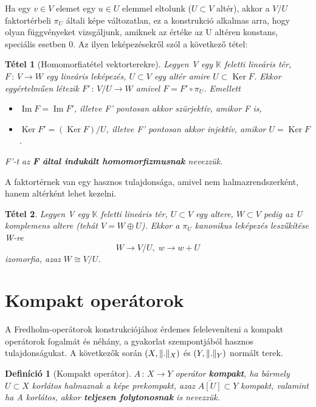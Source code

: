 \documentclass[oneside, titlepage, 12pt, a4paper]{report}
\newtheorem{theorem}{Tétel}[section]
\newtheorem{definition}{Definíció}[section]
\DeclareMathOperator{\Ima}{Im}	%
\DeclareMathOperator{\Ker}{Ker}	%
\DeclarePairedDelimiter\norm{\lVert}{\rVert}	%
\begin{document}
Ha egy $v \in V$ elemet egy $u \in U$ elemmel eltolunk ($U \subset V$ altér), akkor a $V / U$ faktortérbeli $\pi_U$ általi képe változatlan, ez a konstrukció alkalmas arra, hogy olyan függvényeket vizsgáljunk, amiknek az értéke az U altéren konstans, speciális esetben 0. Az ilyen leképezésekről szól a következő tétel:	%
\begin{theorem}[Homomorfiatétel vektorterekre]
Legyen V egy $\mathbb{K}$ feletti lineáris tér, $F \, : \, V \rightarrow W$ egy lineáris leképezés, $U \subset V$ egy altér amire $U \subset \Ker F$. Ekkor egyértelműen létezik $F' \, : \, V / U \rightarrow W$ amivel $F = F' \circ \pi_U$. Emellett
\begin{itemize}
\item
$\Ima F = \Ima F'$, illetve F' pontosan akkor szürjektív, amikor F is,
\item
$\Ker F' = (\Ker F) / U$, illetve F' pontosan akkor injektív, amikor $U = \Ker F$.
\end{itemize}
F'-t az \textbf{F által indukált homomorfizmusnak} nevezzük.	%
\end{theorem}

A faktortérnek van egy hasznos tulajdonsága, amivel nem halmazrendszerként, hanem altérként lehet kezelni.
\begin{theorem}
Legyen V egy $\mathbb{K}$ feletti lineáris tér, $U \subset V$ egy altere, $W \subset V$ pedig az U komplemens altere (tehát $V = W \oplus U$). Ekkor a $\pi_U$ kanonikus leképezés leszűkítése W-re
\begin{equation*}
W \longrightarrow V / U, \; w \longrightarrow w + U
\end{equation*}
izomorfia, azaz $W \cong V / U$.
\end{theorem}



%
\section{Kompakt operátorok}
\label{sec:kompakt}

A Fredholm-operátorok konstrukciójához érdemes feleleveníteni a kompakt operátorok fogalmát és néhány, a gyakorlat szempontjából hasznos tulajdonságukat. A következők során $(X, \norm{.}_X)$ és $(Y, \norm{.}_Y)$ normált terek.
\begin{definition}[Kompakt operátor]
$A \, : \, X \rightarrow Y$ operátor \textbf{kompakt}, ha bármely $U \subset X$ korlátos halmaznak a képe prekompakt, azaz $\overline{A[U]} \subset Y$ kompakt, valamint ha A korlátos, akkor \textbf{teljesen folytonosnak} is nevezzük. \cite{funkanal}
\end{definition}
\end{document}
